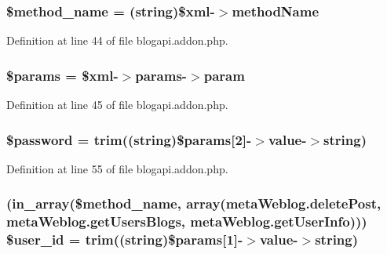 \subsubsection[{\$method\+\_\+name}]{\setlength{\rightskip}{0pt plus 5cm}\$method\+\_\+name = (string)\$xml-\/$>$method\+Name}\label{blogapi_8addon_8php_a88c34f4701e451bbcef63e44e5902ebd}


Definition at line 44 of file blogapi.\+addon.\+php.

\hypertarget{blogapi_8addon_8php_afe68e6fbe7acfbffc0af0c84a1996466}{}
\subsubsection[{\$params}]{\setlength{\rightskip}{0pt plus 5cm}\$params = \$xml-\/$>$params-\/$>$param}\label{blogapi_8addon_8php_afe68e6fbe7acfbffc0af0c84a1996466}


Definition at line 45 of file blogapi.\+addon.\+php.

\hypertarget{blogapi_8addon_8php_a607686ef9f99ea7c42f4f3dd3dbb2b0d}{}
\subsubsection[{\$password}]{\setlength{\rightskip}{0pt plus 5cm}\$password = trim((string)\$params\mbox{[}2\mbox{]}-\/$>$value-\/$>$string)}\label{blogapi_8addon_8php_a607686ef9f99ea7c42f4f3dd3dbb2b0d}


Definition at line 55 of file blogapi.\+addon.\+php.

\hypertarget{blogapi_8addon_8php_a6d0a036129b3030ce289a026c5e1eff2}{}
\subsubsection[{\$user\+\_\+id}]{ (in\+\_\+array(\$method\+\_\+name, array(\textquotesingle{}meta\+Weblog.\+delete\+Post\textquotesingle{}, \textquotesingle{}meta\+Weblog.\+get\+Users\+Blogs\textquotesingle{}, \textquotesingle{}meta\+Weblog.\+get\+User\+Info\textquotesingle{}))) \${\bf user\+\_\+id} = trim((string)\$params\mbox{[}1\mbox{]}-\/$>$value-\/$>$string)}\label{blogapi_8addon_8php_a6d0a036129b3030ce289a026c5e1eff2}


